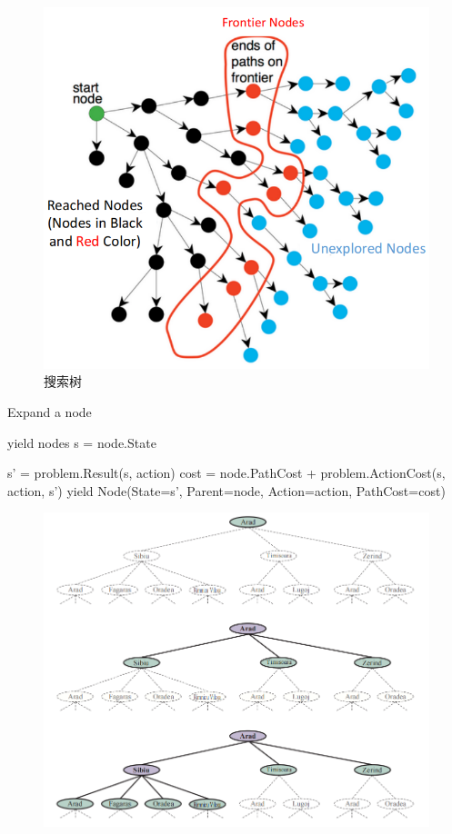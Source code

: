 \begin{figure}[H]
    \centering
    \includegraphics[scale=0.8]{img/C1/1-3/3.png}
    \caption{搜索树}
\end{figure}

\begin{algorithm}[H]
    \caption{Expand a node}
    \begin{algorithmic}[1]
         yield nodes
        \State s = node.State

        \State s' = problem.Result(s, action)
        \State cost = node.PathCost + problem.ActionCost(s, action, s')
        \State yield Node(State=s', Parent=node, Action=action, PathCost=cost)
        \EndFor
        \EndProcedure
    \end{algorithmic}
\end{algorithm}

\begin{figure}[H]
    \centering
    \includegraphics[scale=0.8]{img/C1/1-3/4.png}
\end{figure}

